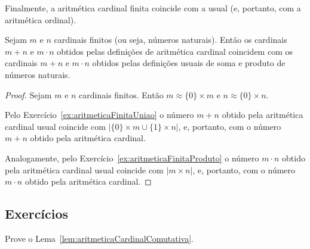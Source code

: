 Finalmente, a aritmética cardinal finita coincide com a usual (e, portanto, com a aritmética ordinal).

\begin{lemma}
    Sejam $m$ e $n$ cardinais finitos (ou seja, números naturais).
    Então os cardinais $m+n$ e $m\cdot n$ obtidos pelas definições de aritmética cardinal coincidem com os cardinais $m+n$ e $m\cdot n$ obtidos pelas definições usuais de soma e produto de números naturais.
\end{lemma}

\begin{proof}
    Sejam $m$ e $n$ cardinais finitos.
    Então $m\approx \{0\}\times m$ e $n\approx \{0\}\times n$.

    Pelo Exercício~\ref{ex:aritmeticaFinitaUniao} o número $m+n$ obtido pela aritmética cardinal usual coincide com $|\{0\}\times m \cup \{1\}\times n|$, e, portanto, com o número $m+n$ obtido pela aritmética cardinal.

    Analogamente, pelo Exercício~\ref{ex:aritmeticaFinitaProduto} o número $m\cdot n$ obtido pela aritmética cardinal usual coincide com $|m\times n|$, e, portanto, com o número $m\cdot n$ obtido pela aritmética cardinal.
\end{proof}

\subsection*{Exercícios}
\begin{exercise}Prove o Lema~\ref{lem:aritmeticaCardinalComutativa}.
\end{exercise}

